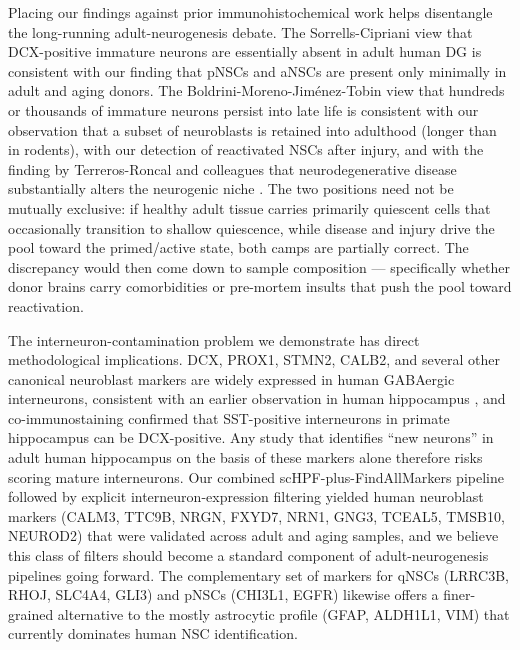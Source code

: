 \documentclass[11pt]{article}
\begin{document}
Placing our findings against prior immunohistochemical work helps
disentangle the long-running adult-neurogenesis debate. The
Sorrells-Cipriani view that DCX-positive immature neurons are essentially
absent in adult human DG \cite{sorrells2018human,cipriani2018hippocampal}
is consistent with our finding that pNSCs and aNSCs are present only
minimally in adult and aging donors. The Boldrini-Moreno-Jim\'{e}nez-Tobin
view that hundreds or thousands of immature neurons persist into late
life \cite{boldrini2018human,morenojimenez2019adult,tobin2019human} is
consistent with our observation that a subset of neuroblasts is retained
into adulthood (longer than in rodents), with our detection of reactivated
NSCs after injury, and with the finding by Terreros-Roncal and colleagues
that neurodegenerative disease substantially alters the neurogenic niche
\cite{terrerosroncal2021impact}. The two positions need not be mutually
exclusive: if healthy adult tissue carries primarily quiescent cells that
occasionally transition to shallow quiescence, while disease and injury
drive the pool toward the primed/active state, both camps are partially
correct. The discrepancy would then come down to sample composition ---
specifically whether donor brains carry comorbidities or pre-mortem
insults that push the pool toward reactivation.

The interneuron-contamination problem we demonstrate has direct
methodological implications. DCX, PROX1, STMN2, CALB2, and several other
canonical neuroblast markers are widely expressed in human GABAergic
interneurons, consistent with an earlier observation in human hippocampus
\cite{franjic2022transcriptomic}, and co-immunostaining confirmed that
SST-positive interneurons in primate hippocampus can be DCX-positive.
Any study that identifies ``new neurons'' in adult human hippocampus on
the basis of these markers alone therefore risks scoring mature
interneurons. Our combined scHPF-plus-FindAllMarkers pipeline followed by
explicit interneuron-expression filtering yielded human neuroblast markers
(CALM3, TTC9B, NRGN, FXYD7, NRN1, GNG3, TCEAL5, TMSB10, NEUROD2) that
were validated across adult and aging samples, and we believe this class
of filters should become a standard component of adult-neurogenesis
pipelines going forward. The complementary set of markers for qNSCs
(LRRC3B, RHOJ, SLC4A4, GLI3) and pNSCs (CHI3L1, EGFR) likewise offers a
finer-grained alternative to the mostly astrocytic profile (GFAP, ALDH1L1,
VIM) that currently dominates human NSC identification.
\end{document}
